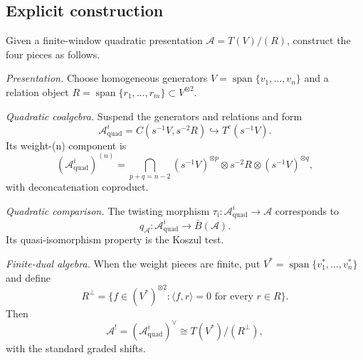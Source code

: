 \subsection{Explicit construction}

\begin{construction}\label{const:quadratic-dual-criteria}
Given a finite-window quadratic presentation
$\mathcal A=T(V)/(R)$, construct the four pieces as follows.

\emph{Presentation.}
Choose homogeneous generators
$V=\operatorname{span}\{v_1,\ldots,v_n\}$ and a relation object
$R=\operatorname{span}\{r_1,\ldots,r_m\}\subset V^{\otimes2}$.

\emph{Quadratic coalgebra.}
Suspend the generators and relations and form
\[
 \mathcal A^i_{\mathrm{quad}}
 =C(s^{-1}V,s^{-2}R)\hookrightarrow T^c(s^{-1}V).
\]
Its weight-(n) component is
\[
 (\mathcal A^i_{\mathrm{quad}})^{(n)}
 =\bigcap_{p+q=n-2}
 (s^{-1}V)^{\otimes p}\otimes s^{-2}R\otimes
 (s^{-1}V)^{\otimes q},
\]
with deconcatenation coproduct.

\emph{Quadratic comparison.}
The twisting morphism
$\tau_{\mathrm i}\colon\mathcal A^i_{\mathrm{quad}}\to\mathcal A$
corresponds to
\[
 q_{\mathcal A}\colon
 \mathcal A^i_{\mathrm{quad}}\longrightarrow\bar B(\mathcal A).
\]
Its quasi-isomorphism property is the Koszul test.

\emph{Finite-dual algebra.}
When the weight pieces are finite, put
$V^*=\operatorname{span}\{v_1^*,\ldots,v_n^*\}$ and define
\[
 R^\perp
 =\{f\in(V^*)^{\otimes2}:\langle f,r\rangle=0
 \text{ for every }r\in R\}.
\]
Then
\[
 \mathcal A^!=(\mathcal A^i_{\mathrm{quad}})^\vee
 \cong T(V^*)/(R^\perp),
\]
with the standard graded shifts.
\end{construction}

